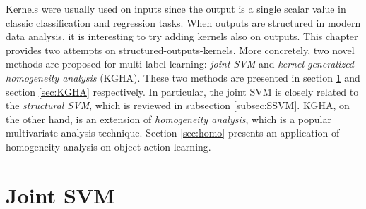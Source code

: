 Kernels were usually used on inputs since the output is a single scalar value in classic classification and regression tasks.   
When outputs are structured in modern data analysis, it is interesting to try adding kernels also on outputs.     
This chapter provides two attempts on structured-outputs-kernels. 
More concretely, two novel methods are proposed for multi-label learning: \emph{joint SVM} and \emph{kernel generalized homogeneity analysis} (KGHA). 
These two methods are presented in section \ref{sec:joint_SVM} and section \ref{sec:KGHA} respectively. In particular, the joint SVM is closely related to 
the \emph{structural SVM}, which is reviewed in subsection \ref{subsec:SSVM}. KGHA, on the other hand, is an extension of \emph{homogeneity analysis}, which is 
a popular multivariate analysis technique. Section \ref{sec:homo} presents an application of homogeneity analysis on object-action learning.    





\section{Joint SVM}
\label{sec:joint_SVM}

